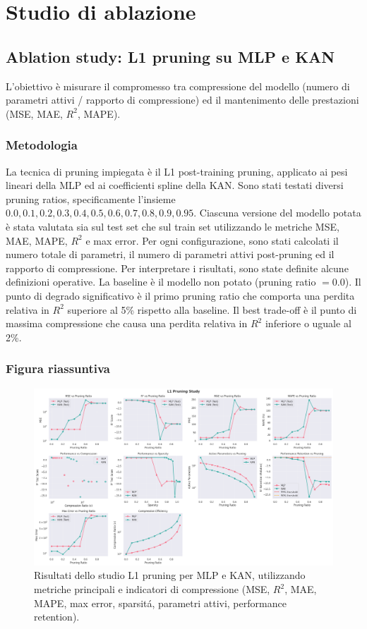 \documentclass[a4paper,12pt]{report}
\begin{document}
	\section{Studio di ablazione}
	
	\subsection{Ablation study: L1 pruning su MLP e KAN}
	L'obiettivo è misurare il compromesso tra compressione del modello (numero di parametri attivi / rapporto di compressione) ed il mantenimento delle prestazioni (MSE, MAE, \(R^2\), MAPE).
	
	\subsubsection{Metodologia}
	La tecnica di pruning impiegata è il L1 post-training pruning, applicato ai pesi lineari della MLP ed ai coefficienti spline della KAN. Sono stati testati diversi pruning ratios, specificamente l'insieme ${0.0,0.1,0.2,0.3,0.4,0.5,0.6,0.7,0.8,0.9,0.95}$. Ciascuna versione del modello potata è stata valutata sia sul test set che sul train set utilizzando le metriche MSE, MAE, MAPE, $R^2$ e max error. Per ogni configurazione, sono stati calcolati il numero totale di parametri, il numero di parametri attivi post-pruning ed il rapporto di compressione. Per interpretare i risultati, sono state definite alcune definizioni operative. La baseline è il modello non potato (pruning ratio $= 0.0$). Il punto di degrado significativo è il primo pruning ratio che comporta una perdita relativa in $R^2$ superiore al 5\% rispetto alla baseline. Il best trade-off è il punto di massima compressione che causa una perdita relativa in $R^2$ inferiore o uguale al 2\%.
	
	\subsubsection{Figura riassuntiva}
	\begin{figure}[H]
		\centering
		\includegraphics[width=1.0\textwidth]{img/abl_kanvsmlp_car.png}
		\caption{Risultati dello studio L1 pruning per MLP e KAN, utilizzando metriche principali e indicatori di compressione (MSE, \(R^2\), MAE, MAPE, max error, sparsitá, parametri attivi, performance retention).}
	\end{figure}
	
\end{document}
